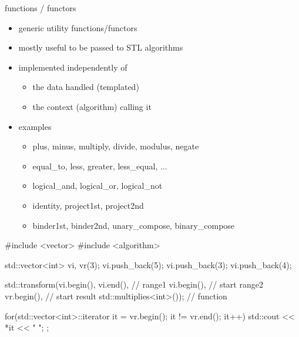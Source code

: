 \begin{frame}[fragile]
  \begin{block}{functions / functors}
    \begin{itemize}
      \item generic utility functions/functors
      \item mostly useful to be passed to STL algorithms
    \item implemented independently of
      \begin{itemize}
      \item the data handled (templated)
      \item the context (algorithm) calling it
      \end{itemize}
    \item examples
      \begin{itemize}
      \item plus, minus, multiply, divide, modulus, negate
      \item equal\_to, less, greater, less\_equal, ...
      \item logical\_and, logical\_or, logical\_not
      \item identity, project1st, project2nd
      \item binder1st, binder2nd, unary\_compose, binary\_compose
      \end{itemize}
    \end{itemize}
  \end{block}
\end{frame}


\begin{frame}[fragile]
  \begin{cppcode*}{}
    #include <vector>
    #include <algorithm>

    std::vector<int> vi, vr(3);
    vi.push_back(5); vi.push_back(3); vi.push_back(4);

    std::transform(vi.begin(), vi.end(),      // range1
                   vi.begin(),          // start range2
                   vr.begin(),          // start result
                   std::multiplies<int>()); // function

    for(std::vector<int>::iterator it = vr.begin();
        it != vr.end();
        it++) {
      std::cout << *it << " ";
    };
  \end{cppcode*}
\end{frame}

